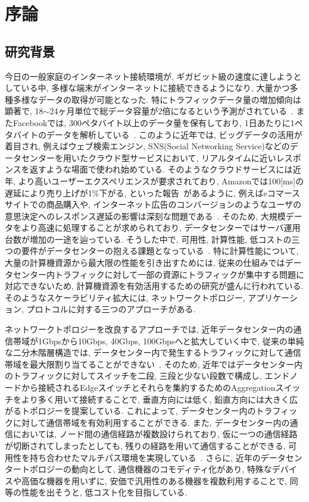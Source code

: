 \chapter{序論}

\section{研究背景}
今日の一般家庭のインターネット接続環境が, ギガビット級の速度に達しようとしている中, 多様な端末がインターネットに接続できるようになり,
大量かつ多種多様なデータの取得が可能となった.
特にトラフィックデータ量の増加傾向は顕著で, 18$\sim$24ヶ月単位で総データ容量が2倍になるという予測がされている~\cite{IBM_rep}.
またFacebookでは, 300ペタバイト以上のデータ量を保有しており, 1日あたりに1ペタバイトのデータを解析している~\cite{presto}.
このように近年では, ビッグデータの活用が着目され, 例えばウェブ検索エンジン, SNS(Social Networking
Service)などのデータセンターを用いたクラウド型サービスにおいて, リアルタイムに近いレスポンスを返すような場面で使われ始めている.
そのようなクラウドサービスには近年, より高いユーザーエクスペリエンスが要求されており,
Amazonでは100[ms]の遅延により売り上げが1\%下がる, といった報告~\cite{amazon}があるように,
例えばeコマースサイトでの商品購入や,
インターネット広告のコンバージョンのようなユーザの意思決定へのレスポンス遅延の影響は深刻な問題である~\cite{customer_impact}.
そのため, 大規模データをより高速に処理することが求められており, データセンターではサーバ運用台数が増加の一途を辿っている.
そうした中で, 可用性, 計算性能, 低コストの三つの要件がデータセンターの抱える課題となっている~\cite{requirement}.
特に計算性能について, 大量の計算機資源から最大限の性能を引き出すためには,
従来の仕組みではデータセンター内トラフィックに対して一部の資源にトラフィックが集中する問題に対応できないため,
計算機資源を有効活用するための研究が盛んに行われている\cite{mapreduce, fattree,
dctcp, improving, detail, p_fab, synchro}.
そのようなスケーラビリティ拡大には, ネットワークトポロジー, アプリケーション, プロトコルに対する三つのアプローチがある.

ネットワークトポロジーを改良するアプローチでは, 近年データセンター内の通信帯域が1Gbpsから10Gbps, 40Gbps,
100Gbpsへと拡大していく中で, 従来の単純な二分木階層構造では,
データセンター内で発生するトラフィックに対して通信帯域を最大限割り当てることができない~\cite{fattree}.
そのため,
近年ではデータセンター内のトラフィックに対してスイッチを二段, 三段と少ない段数で構成し,
エンドノードから接続されるEdgeスイッチとそれらを集約するためのAggregationスイッチをより多く用いて接続することで, 
垂直方向には低く, 鉛直方向には大きく広がるトポロジーを提案している. 
これによって, データセンター内のトラフィックに対して通信帯域を有効利用することができる. 
また, データセンター内の通信においては, ノード間の通信経路が複数設けられており, 仮に一つの通信経路が切断されてしまったとしても,
残りの経路を用いて通信することができる, 可用性を持ち合わせたマルチパス環境を実現している~\cite{fattree}.
さらに, 近年のデータセンタートポロジーの動向として, 通信機器のコモディティ化があり, 特殊なデバイスや高価な機器を用いずに,
安価で汎用性のある機器を複数利用することで, 同等の性能を出そうと, 低コスト化を目指している\cite{dctcp}. 

